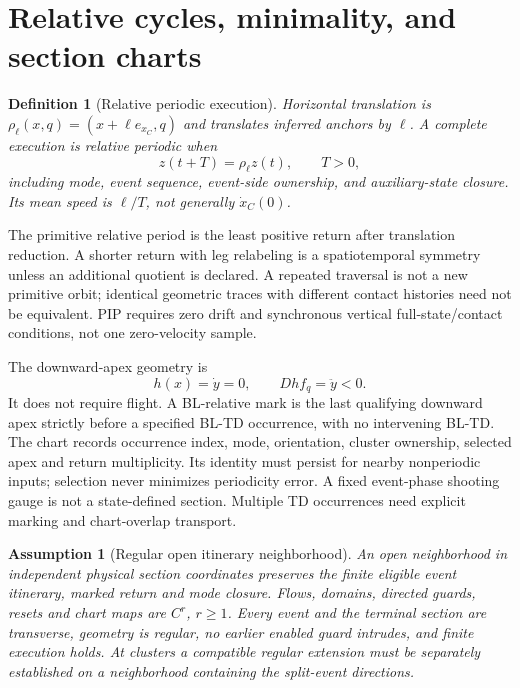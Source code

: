 \documentclass[11pt]{article}
\newtheorem{definition}{Definition}
\newtheorem{assumption}{Assumption}
\begin{document}
\section{Relative cycles, minimality, and section charts}
\begin{definition}[Relative periodic execution]
Horizontal translation is $\rho_\ell(x,q)=(x+\ell e_{x_C},q)$ and translates
inferred anchors by $\ell$. A complete execution is relative periodic when
\[
z(t+T)=\rho_\ell z(t),\qquad T>0,
\]
including mode, event sequence, event-side ownership, and auxiliary-state
closure. Its mean speed is $\ell/T$, not generally $\dot x_C(0)$.
\end{definition}
The primitive relative period is the least positive return after translation
reduction. A shorter return with leg relabeling is a spatiotemporal symmetry
unless an additional quotient is declared. A repeated traversal is not a
new primitive orbit; identical geometric traces with different contact
histories need not be equivalent. PIP requires zero drift and synchronous
vertical full-state/contact conditions, not one zero-velocity sample.

The downward-apex geometry is
\[
h(x)=\dot y=0,\qquad Dh f_q=\ddot y<0.
\]
It does not require flight. A BL-relative mark is the last qualifying
downward apex strictly before a specified BL-TD occurrence, with no
intervening BL-TD. The chart records occurrence index, mode, orientation,
cluster ownership, selected apex and return multiplicity. Its identity must
persist for nearby nonperiodic inputs; selection never minimizes periodicity
error. A fixed event-phase shooting gauge is not a state-defined section.
Multiple TD occurrences need explicit marking and chart-overlap transport.

\begin{assumption}[Regular open itinerary neighborhood]\label{ass:regular}
An open neighborhood in independent physical section coordinates preserves
the finite eligible event itinerary, marked return and mode closure. Flows,
domains, directed guards, resets and chart maps are $C^r$, $r\ge1$. Every
event and the terminal section are transverse, geometry is regular, no
earlier enabled guard intrudes, and finite execution holds. At clusters a
compatible regular extension must be separately established on a neighborhood
containing the split-event directions.
\end{assumption}
\end{document}
